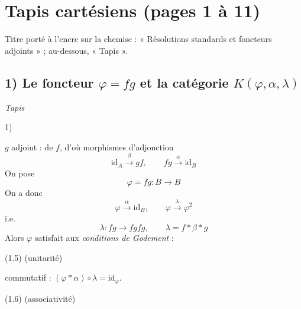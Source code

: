 \documentclass[11pt,a4paper]{article}
\begin{document}
\section*{Tapis cartésiens (pages 1 à 11)}

Titre porté à l'encre sur la chemise : « Résolutions standards et foncteurs
adjoints » ; au-dessous, « Tapis  ».

\subsection*{1) Le foncteur $\varphi = fg$ et la catégorie $K(\varphi,\alpha,\lambda)$}

\emph{Tapis }

1) \quad
{}
\quad $g$ adjoint :  de $f$, d'où morphismes d'adjonction
\[
  \mathrm{id}_{A} \xrightarrow{\ \beta\ } gf , \qquad
  fg \xrightarrow{\ \alpha\ } \mathrm{id}_{B}
  \tag{1.1}
\]
On pose
\[
  \varphi = fg : B \longrightarrow B
  \tag{1.2}
\]
On a donc
\[
  \varphi \xrightarrow{\ \alpha\ } \mathrm{id}_{B} , \qquad
  \varphi \xrightarrow{\ \lambda\ } \varphi^{2}
  \tag{1.3}
\]
i.e.
\[
  \lambda : fg \longrightarrow fgfg , \qquad \lambda = f * \beta * g
  \tag{1.4}
\]
Alors $\varphi$ satisfait aux \emph{conditions de Godement} :

(1.5) \quad (unitarité)


commutatif : $(\varphi * \alpha) \circ \lambda = \mathrm{id}_{\varphi}$.

(1.6) \quad (associativité)

\end{document}
